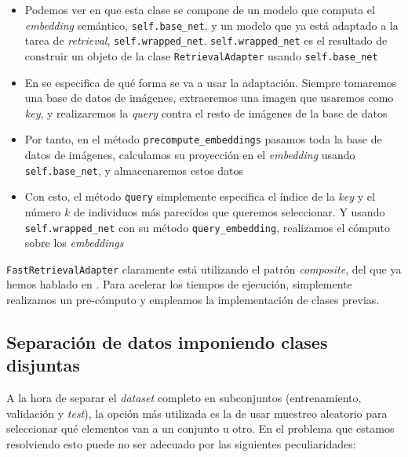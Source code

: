 \begin{itemize}
    \item Podemos ver en  que esta clase se compone de un modelo que computa el \textit{embedding} semántico, \lstinline{self.base_net}, y un modelo que ya está adaptado a la tarea de \textit{retrieval}, \lstinline{self.wrapped_net}. \lstinline{self.wrapped_net} es el resultado de construir un objeto de la clase \lstinline{RetrievalAdapter} usando \lstinline{self.base_net}
    \item En  se especifica de qué forma se va a usar la adaptación. Siempre tomaremos una base de datos de imágenes, extraeremos una imagen que usaremos como \textit{key}, y realizaremos la \textit{query} contra el resto de imágenes de la base de datos
    \item Por tanto, en el método \lstinline{precompute_embeddings} pasamos toda la base de datos de imágenes, calculamos su proyección en el \textit{embedding} usando \lstinline{self.base_net}, y almacenaremos estos datos
    \item Con esto, el método \lstinline{query} simplemente especifica el índice de la \textit{key} y el número $k$ de individuos más parecidos que queremos seleccionar. Y usando \lstinline{self.wrapped_net} con su método \lstinline{query_embedding}, realizamos el cómputo sobre los \textit{embeddings}
\end{itemize}

\lstinline{FastRetrievalAdapter} claramente está utilizando el patrón \textit{composite}, del que ya hemos hablado en . Para acelerar los tiempos de ejecución, simplemente realizamos un pre-cómputo y empleamos la implementación de clases previas.

\subsection{Separación de datos imponiendo clases disjuntas}

A la hora de separar el \textit{dataset} completo en subconjuntos (entrenamiento, validación y \textit{test}), la opción más utilizada es la de usar muestreo aleatorio para seleccionar qué elementos van a un conjunto u otro. En el problema que estamos resolviendo esto puede no ser adecuado por las siguientes peculiaridades:

